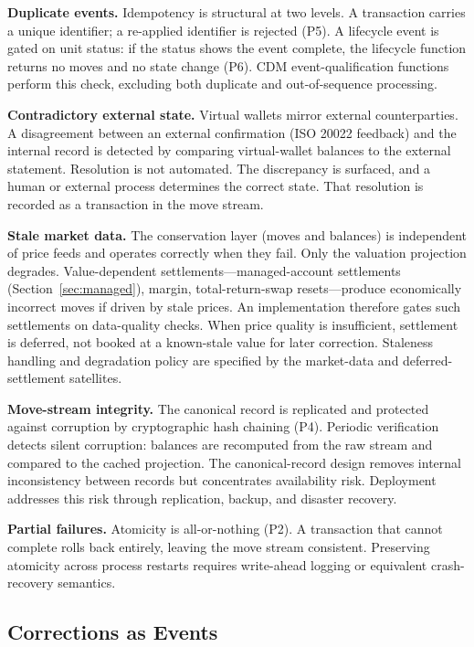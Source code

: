 \noindent\textbf{Duplicate events.} Idempotency is structural at two levels. A transaction carries a unique identifier; a re-applied identifier is rejected (P5). A lifecycle event is gated on unit status: if the status shows the event complete, the lifecycle function returns no moves and no state change (P6). CDM event-qualification functions perform this check, excluding both duplicate and out-of-sequence processing.

\noindent\textbf{Contradictory external state.} Virtual wallets mirror external counterparties. A disagreement between an external confirmation (ISO 20022 feedback) and the internal record is detected by comparing virtual-wallet balances to the external statement. Resolution is not automated. The discrepancy is surfaced, and a human or external process determines the correct state. That resolution is recorded as a transaction in the move stream.

\noindent\textbf{Stale market data.} The conservation layer (moves and balances) is independent of price feeds and operates correctly when they fail. Only the valuation projection degrades. Value-dependent settlements---managed-account settlements (Section~\ref{sec:managed}), margin, total-return-swap resets---produce economically incorrect moves if driven by stale prices. An implementation therefore gates such settlements on data-quality checks. When price quality is insufficient, settlement is deferred, not booked at a known-stale value for later correction. Staleness handling and degradation policy are specified by the market-data and deferred-settlement satellites.

\noindent\textbf{Move-stream integrity.} The canonical record is replicated and protected against corruption by cryptographic hash chaining (P4). Periodic verification detects silent corruption: balances are recomputed from the raw stream and compared to the cached projection. The canonical-record design removes internal inconsistency between records but concentrates availability risk. Deployment addresses this risk through replication, backup, and disaster recovery.

\noindent\textbf{Partial failures.} Atomicity is all-or-nothing (P2). A transaction that cannot complete rolls back entirely, leaving the move stream consistent. Preserving atomicity across process restarts requires write-ahead logging or equivalent crash-recovery semantics.

\subsection{Corrections as Events}
\label{sec:implementation-corrections}

